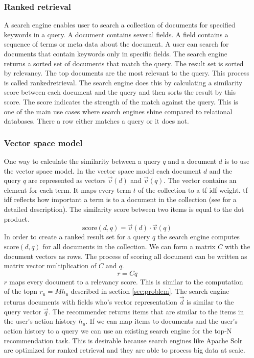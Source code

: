\subsubsection{Ranked retrieval}
A search engine enables user to search a collection of documents for specified keywords in a query. A document contains several \glspl{field}. A \gls{field} contains a sequence of terms or meta data about the document. A user can search for documents that contain keywords only in specific fields. The search engine returns a sorted set of documents that match the query. The result set is sorted by relevancy. The top documents are the most relevant to the query. This process is called \gls{rankedretrieval}. The search engine does this by calculating a similarity score between each document and the query and then sorts the result by this score. The score indicates the strength of the match against the query. This is one of the main use cases where search engines shine compared to relational databases. There a row either matches a query or it does not. 

\subsubsection{Vector space model}
One way to calculate the similarity between a query $q$ and a document $d$ is to use the vector space model.
In the vector space model each document $d$ and the query $q$ are represented as vectors $\vec{v}(d)$ and $\vec{v}(q)$. The vector contains an element for each term. It maps every term $t$ of the collection to a tf-idf weight. tf-idf reflects how important a term is to a document in the collection (see \cite{Manning} for a detailed description). 
The similarity score between two items is equal to the dot product.
\begin{equation}
  \label{eq:score}
  \text{score}(d,q) = \vec{v}(d) \cdot \vec{v}(q)
\end{equation}
In order to create a ranked result set for a query $q$ the search engine computes $\text{score}(d,q)$ for all documents in the collection. We can form a matrix $C$ with the document vectors as rows. The process of scoring all document can be written as matrix vector multiplication of $C$ and $q$. 
\begin{equation}
  \label{eq:ser}
  r = C q
\end{equation}
$r$ maps every document to a relevancy score.
This is similar to the computation of the \gls{topn} $r_u = M h_u$  described in section \ref{sec:problem}. The search engine returns documents with fields who's vector representation $\vec{d}$ is similar to the query vector $\vec{q}$. The recommender returns items that are similar to the items in the user's action history $h_u$. If we can map items to documents and the user's action history to a query we can use an existing search engine for the top-N recommendation task. This is desirable because search engines like Apache Solr are optimized for ranked retrieval and they are able to process big data at scale. 

